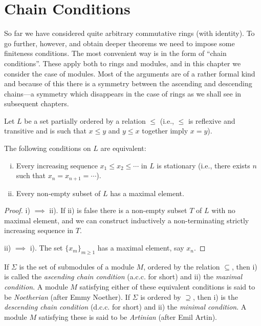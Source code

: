 \chapter{Chain Conditions}\label{chapter6}

So far we have considered quite arbitrary commutative rings (with identity). To go further, however, and obtain deeper theorems we need to impose some finiteness conditions. The most convenient way is in the form of ``chain conditions''. These apply both to rings and modules, and in this chapter we consider the case of modules. Most of the arguments are of a rather formal kind and because of this there is a symmetry between the ascending and descending chains---a symmetry which disappears in the case of rings as we shall see in subsequent chapters.

Let $L$ be a set partially ordered by a relation $\leq$ (i.e., $\leq$ is reflexive and transitive and is such that $x \leq y$ and $y \leq x$ together imply $x = y$).

\begin{proposition}\label{prop:chain-equivalent}
The following conditions on $L$ are equivalent:
\begin{enumerate}[i)]
    \item Every increasing sequence $x_1 \leq x_2 \leq \cdots$ in $L$ is stationary (i.e., there exists $n$ such that $x_n = x_{n+1} = \cdots$).
    \item Every non-empty subset of $L$ has a maximal element.
\end{enumerate}
\end{proposition}

\begin{proof}
i) $\implies$ ii). If ii) is false there is a non-empty subset $T$ of $L$ with no maximal element, and we can construct inductively a non-terminating strictly increasing sequence in $T$.

ii) $\implies$ i). The set $\{x_m\}_{m \geq 1}$ has a maximal element, say $x_n$.
\end{proof}

If $\Sigma$ is the set of submodules of a module $M$, ordered by the relation $\subseteq$, then  
i) is called the \emph{ascending chain condition} (a.c.c. for short) and ii) the \emph{maximal condition}. A module $M$ satisfying either of these equivalent conditions is said to be \emph{Noetherian} (after Emmy Noether). If $\Sigma$ is ordered by $\supseteq$, then i) is the \emph{descending chain condition} (d.c.c. for short) and ii) the \emph{minimal condition}. A module $M$ satisfying these is said to be \emph{Artinian} (after Emil Artin).

